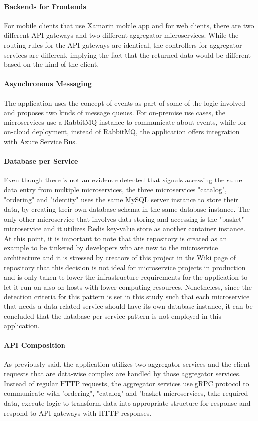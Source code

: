\documentclass{Configuration_Files/PoliMi3i_thesis}
\begin{document}
\paragraph{Backends for Frontends} For mobile clients that use Xamarin mobile app and for web clients, there are two different API gateways and two different aggregator microservices.
While the routing rules for the API gateways are identical, the controllers for aggregator services are different, implying the fact that the returned data would be different based on the kind of the client.

\paragraph{Asynchronous Messaging} The application uses the concept of events as part of some of the logic involved and proposes two kinds of message queues.
For on-premise use cases, the microservices use a RabbitMQ instance to communicate about events, while for on-cloud deployment, instead of RabbitMQ, the application offers integration with Azure Service Bus.

\paragraph{Database per Service} Even though there is not an evidence detected that signals accessing the same data entry from multiple microservices, the three microservices "catalog", "ordering" and "identity" uses the same MySQL server instance to store their data, by creating their own database schema in the same database instance.
The only other microservice that involves data storing and accessing is the "basket" microservice and it utilizes Redis key-value store as another container instance.
At this point, it is important to note that this repository is created as an example to be tinkered by developers who are new to the microservice architecture and it is stressed by creators of this project in the Wiki page of repository that this decision is not ideal for microservice projects in production and is only taken to lower the infrastructure requirements for the application to let it run on also on hosts with lower computing resources.
Nonetheless, since the detection criteria for this pattern is set in this study such that each microservice that needs a data-related service should have its own database instance, it can be concluded that the database per service pattern is not employed in this application.

\paragraph{API Composition} As previously said, the application utilizes two aggregator services and the client requests that are data-wise complex are handled by those aggregator services.
Instead of regular HTTP requests, the aggregator services use gRPC protocol to communicate with "ordering", "catalog" and "basket microservices, take required data, execute logic to transform data into appropriate structure for response and respond to API gateways with HTTP responses.
\end{document}
